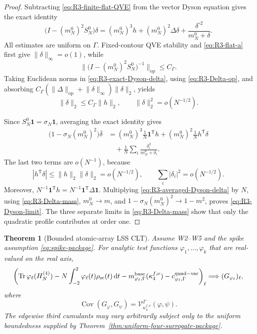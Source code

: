 \documentclass[11pt]{article}
\newtheorem{theorem}{Theorem}[section]
\theoremstyle{definition}
\theoremstyle{remark}
\newcommand{\Cov}{\operatorname{Cov}}
\newcommand{\Tr}{\operatorname{Tr}}
\newcommand{\scal}{\mathrm{sc}}
\newcommand{\dd}{\mathrm d}
\newcommand{\op}{\mathrm{op}}
\newcommand{\one}{\mathbf 1}
\newcommand{\norm}[1]{\lVert #1\rVert}
\begin{document}
\begin{proof}
Subtracting \eqref{eq:R3-finite-flat-QVE} from the vector Dyson equation
gives the exact identity
\begin{equation}\label{eq:R3-exact-Dyson-delta}
 \bigl(I-(m_N^0)^2S_N^0\bigr)\delta
 =(m_N^0)^3h+(m_N^0)^2\Delta\delta
 +\frac{\delta^{\circ2}}{m_N^0+\delta}.
\end{equation}
All estimates are uniform on \(\Gamma\).  Fixed-contour QVE stability and
\eqref{eq:R3-flat-a} first give \(\norm\delta_\infty=o(1)\), while
\[
 \norm{\bigl(I-(m_N^0)^2S_N^0\bigr)^{-1}}_{\op}
 \le C_\Gamma.
\]
Taking Euclidean norms in \eqref{eq:R3-exact-Dyson-delta}, using
\eqref{eq:R3-Delta-op}, and absorbing
\(C_\Gamma(\norm\Delta_{\op}+\norm\delta_\infty)\norm\delta_2\), yields
\begin{equation}\label{eq:R3-delta-two}
 \norm\delta_2\le C_\Gamma\norm h_2,
 \qquad \norm\delta_2^2=o(N^{-1/2}).
\end{equation}

Since \(S_N^0\one=\sigma_N\one\), averaging the exact identity gives
\begin{align}
 \bigl(1-\sigma_N(m_N^0)^2\bigr)\overline\delta
 &=(m_N^0)^3\frac1N\one^{\mathsf T}h
 +(m_N^0)^2\frac1N h^{\mathsf T}\delta\nonumber\\
 &\quad+\frac1N\sum_i\frac{\delta_i^2}{m_N^0+\delta_i}.
 \label{eq:R3-averaged-Dyson-delta}
\end{align}
The last two terms are \(o(N^{-1})\), because
\[
 |h^{\mathsf T}\delta|
 \le\norm h_2\norm\delta_2=o(N^{-1/2}),
 \qquad
 \sum_i|\delta_i|^2=o(N^{-1/2}).
\]
Moreover, \(N^{-1}\one^{\mathsf T}h=N^{-1}\one^{\mathsf T}\Delta\one\).
Multiplying \eqref{eq:R3-averaged-Dyson-delta} by \(N\), using
\eqref{eq:R3-Delta-mass}, \(m_N^0\to m\), and
\(1-\sigma_N(m_N^0)^2\to1-m^2\), proves
\eqref{eq:R3-Dyson-limit}.  The three separate limits in
\eqref{eq:R3-Delta-mass} show that only the quadratic profile contributes at
order one.
\end{proof}

\begin{theorem}[Bounded atomic-array LSS CLT]
\label{thm:R3-bounded-CLT}
Assume W2--W5 and the spike assumption
\eqref{eq:spike-package}.  For analytic test functions
\(\varphi_1,\ldots,\varphi_k\) that are real-valued on the real axis,
\begin{equation}\label{eq:R3-final-CLT}
 \left(
 \Tr\varphi_\ell(H_N^{(4)})
 -N\int_{-2}^2\varphi_\ell(t)\rho_{\scal}(t)\,\dd t
 -m_{\varphi_\ell,\Gamma}^{\rm base}(\kappa_4^{f,\nu})
 -c_{\varphi_\ell,\Gamma}^{\rm quad-var}
 \right)_\ell
 \Longrightarrow (G_{\varphi_\ell})_\ell ,
\end{equation}
where
\[
 \Cov(G_\varphi,G_\psi)
 =\mathcal V_{\kappa_4^{f,\nu}}^\Gamma(\varphi,\psi).
\]
The edgewise third cumulants may vary arbitrarily subject only to the uniform boundedness supplied by
Theorem~\ref{thm:uniform-four-surrogate-package}.
\end{theorem}
\end{document}

